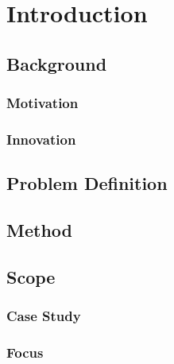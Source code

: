 \chapter{Introduction}

\section{Background}
	\subsection{Motivation}
	\subsection{Innovation}

\section{Problem Definition}

\section{Method}

\section{Scope}
	\subsection{Case Study}
	\subsection{Focus}

